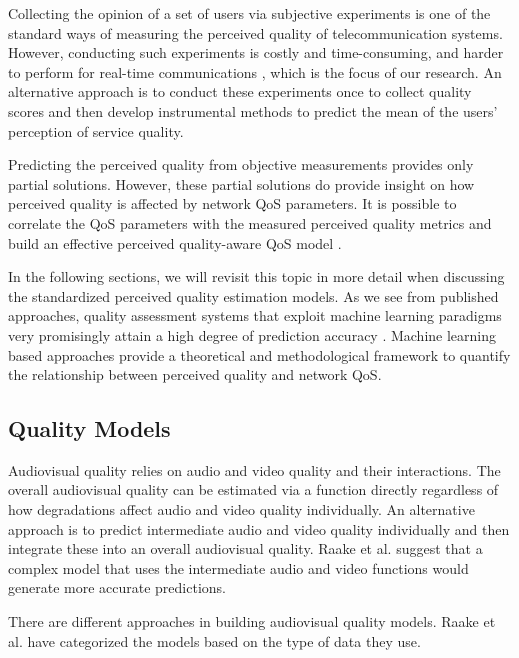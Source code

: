 \documentclass[journal]{IEEEtran}
\begin{document}
Collecting the opinion of a set of users via subjective experiments is one of the standard ways of measuring the perceived quality of telecommunication systems. However, conducting such experiments is costly and time-consuming, and harder to perform for real-time communications \cite{li2014real}, which is the focus of our research. An alternative approach is to conduct these experiments once to collect quality scores and then develop instrumental methods to predict the mean of the users' perception of service quality.

Predicting the perceived quality from objective measurements provides only partial solutions. However, these partial solutions do provide insight on how perceived quality is affected by network QoS parameters. It is possible to correlate the QoS parameters with the measured perceived quality metrics and build an effective perceived quality-aware QoS model \cite{rifai2011brief}.

In the following sections, we will revisit this topic in more detail when discussing the standardized perceived quality estimation models. As we see from published approaches, quality assessment systems that exploit machine learning paradigms very promisingly attain a high degree of prediction accuracy \cite{aroussi2014survey} \cite{anegekuh2015content}. Machine learning based approaches provide a theoretical and methodological framework to quantify the relationship between perceived quality and network QoS.

\vspace{-0.2cm}
\subsection{Quality Models}
\label{subsec:QualityModels}

Audiovisual quality relies on audio and video quality and their interactions. The overall audiovisual quality can be estimated via a function directly regardless of how degradations affect audio and video quality individually. An alternative approach is to predict intermediate audio and video quality individually and then integrate these into an overall audiovisual quality. Raake et al. \cite{raake2011ip} suggest that a complex model that uses the intermediate audio and video functions would generate more accurate predictions.

There are different approaches in building audiovisual quality models. Raake et al. \cite{raake2011ip} have categorized the models based on the type of data they use.
\end{document}
